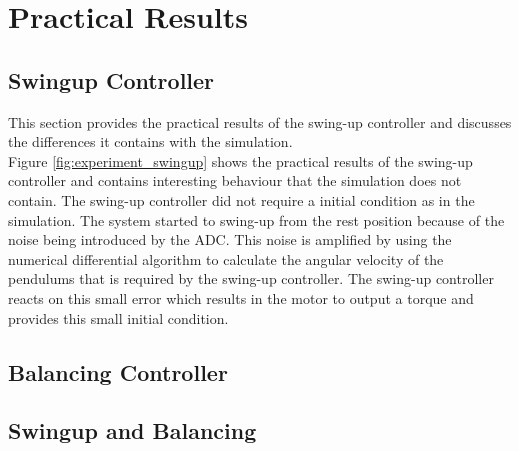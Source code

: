 \chapter{Practical Results}
\label{chp:prac_results}






\section{Swingup Controller}
This section provides the practical results of the swing-up controller and discusses the differences it contains with the simulation. \\

Figure \ref{fig:experiment_swingup} shows the practical results of the swing-up controller and contains interesting behaviour that the simulation does not contain. The swing-up controller did not require a initial condition as in the simulation. The system started to swing-up from the rest position because of the noise being introduced by the ADC. This noise is amplified by using the numerical differential algorithm to calculate the angular velocity of the pendulums that is required by the swing-up controller. The swing-up controller reacts on this small error which results in the motor to output a torque and provides this small initial condition.\\




\section{Balancing Controller}
\section{Swingup and Balancing}

